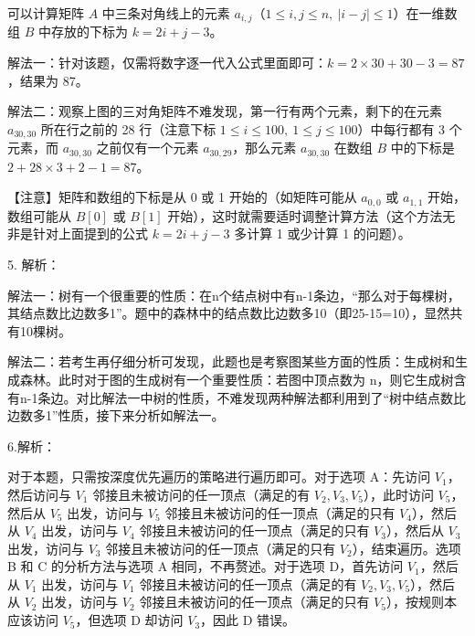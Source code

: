 \documentclass[UTF8,11pt]{ctexart}
\begin{document}
可以计算矩阵 \(\displaystyle A\) 中三条对角线上的元素 \(\displaystyle a_{i,\allowbreak j}\)（\(\displaystyle 1\leq i,\allowbreak j\leq n,\allowbreak \ |i-j|\leq1\)）在一维数组 \(\displaystyle B\) 中存放的下标为 \(\displaystyle k=2i+j-3\)。


解法一：针对该题，仅需将数字逐一代入公式里面即可：\(\displaystyle k=2\times30+30-3=87\)，结果为 87。


解法二：观察上图的三对角矩阵不难发现，第一行有两个元素，剩下的在元素 \(\displaystyle a_{30,\allowbreak 30}\) 所在行之前的 28 行（注意下标 \(\displaystyle 1\leq i\leq100,\allowbreak \ 1\leq j\leq100\)）中每行都有 3 个元素，而 \(\displaystyle a_{30,\allowbreak 30}\) 之前仅有一个元素 \(\displaystyle a_{30,\allowbreak 29}\)，那么元素 \(\displaystyle a_{30,\allowbreak 30}\) 在数组 \(\displaystyle B\) 中的下标是 \(\displaystyle 2+28\times3+2-1=87\)。


【注意】矩阵和数组的下标是从 0 或 1 开始的（如矩阵可能从 \(\displaystyle a_{0,\allowbreak 0}\) 或 \(\displaystyle a_{1,\allowbreak 1}\) 开始，数组可能从 \(\displaystyle B[0]\) 或 \(\displaystyle B[1]\) 开始），这时就需要适时调整计算方法（这个方法无非是针对上面提到的公式 \(\displaystyle k=2i+j-3\) 多计算 1 或少计算 1 的问题）。


5. 解析：


解法一：树有一个很重要的性质：在n个结点树中有n-1条边，“那么对于每棵树，其结点数比边数多1”。题中的森林中的结点数比边数多10（即25-15=10），显然共有10棵树。


解法二：若考生再仔细分析可发现，此题也是考察图某些方面的性质：生成树和生成森林。此时对于图的生成树有一个重要性质：若图中顶点数为 n，则它生成树含有n-1条边。对比解法一中树的性质，不难发现两种解法都利用到了“树中结点数比边数多1”性质，接下来分析如解法一。


6.解析：


对于本题，只需按深度优先遍历的策略进行遍历即可。对于选项 A：先访问 \(\displaystyle V_1\)，然后访问与 \(\displaystyle V_1\) 邻接且未被访问的任一顶点（满足的有 \(\displaystyle V_2,\allowbreak V_3,\allowbreak V_5\)），此时访问 \(\displaystyle V_5\)，然后从 \(\displaystyle V_5\) 出发，访问与 \(\displaystyle V_5\) 邻接且未被访问的任一顶点（满足的只有 \(\displaystyle V_4\)），然后从 \(\displaystyle V_4\) 出发，访问与 \(\displaystyle V_4\) 邻接且未被访问的任一顶点（满足的只有 \(\displaystyle V_3\)），然后从 \(\displaystyle V_3\) 出发，访问与 \(\displaystyle V_3\) 邻接且未被访问的任一顶点（满足的只有 \(\displaystyle V_2\)），结束遍历。选项 B 和 C 的分析方法与选项 A 相同，不再赘述。对于选项 D，首先访问 \(\displaystyle V_1\)，然后从 \(\displaystyle V_1\) 出发，访问与 \(\displaystyle V_1\) 邻接且未被访问的任一顶点（满足的有 \(\displaystyle V_2,\allowbreak V_3,\allowbreak V_5\)），然后从 \(\displaystyle V_2\) 出发，访问与 \(\displaystyle V_2\) 邻接且未被访问的任一顶点（满足的只有 \(\displaystyle V_5\)），按规则本应该访问 \(\displaystyle V_5\)，但选项 D 却访问 \(\displaystyle V_3\)，因此 D 错误。
\end{document}
